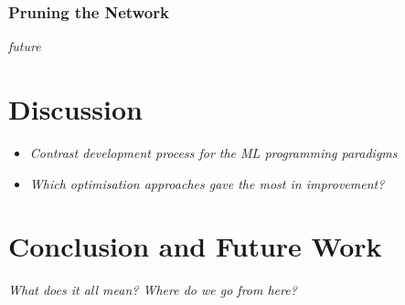 \subsection{Pruning the Network}
\textit{future}

\chapter{Discussion}
\begin{itemize}
	\item \textit{Contrast development process for the ML programming paradigms}
	\item \textit{Which optimisation approaches gave the most in improvement?}
\end{itemize}

\chapter{Conclusion and Future Work}
\textit{What does it all mean? Where do we go from here?}
